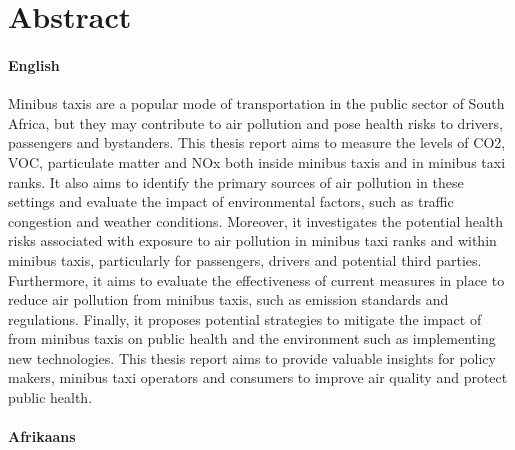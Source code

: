 \chapter*{Abstract}
\makeatletter{}\makeatother

\subsubsection*{English}

Minibus taxis are a popular mode of transportation in the public sector of South Africa, but they may contribute to air pollution and pose health risks to drivers, passengers and bystanders. This thesis report aims to measure the levels of CO2, VOC, particulate matter and NOx both inside minibus taxis and in minibus taxi ranks. It also aims to identify the primary sources of air pollution in these settings and evaluate the impact of environmental factors, such as traffic congestion and weather conditions. Moreover, it investigates the potential health risks associated with exposure to air pollution in minibus taxi ranks and within minibus taxis, particularly for passengers, drivers and potential third parties. Furthermore, it aims to evaluate the effectiveness of current measures in place to reduce air pollution from minibus taxis, such as emission standards and regulations. Finally, it proposes potential strategies to mitigate the impact of from minibus taxis on public health and the environment such as implementing new technologies. This thesis report aims to provide valuable insights for policy makers, minibus taxi operators and consumers to improve air quality and protect public health.




\subsubsection*{Afrikaans}

